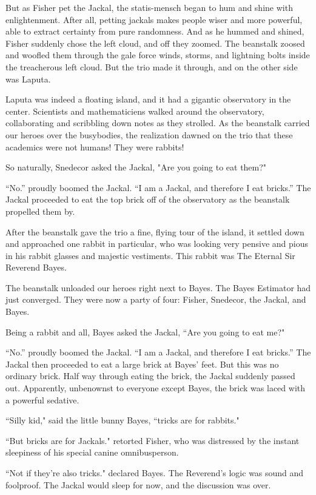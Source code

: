 \documentclass{article}
\begin{document}
But as Fisher pet the Jackal, the statis-mensch began to hum and shine with enlightenment. After all, petting jackals makes people wiser and more powerful, able to extract certainty from pure randomness. And as he hummed and shined, Fisher suddenly chose the left cloud, and off they zoomed. The beanstalk zoosed and woofled them through the gale force winds, storms, and lightning bolts inside the treacherous left cloud. But the trio made it through, and on the other side was Laputa. \newline

Laputa was indeed a floating island, and it had a gigantic observatory in the center. Scientists and mathematiciens walked around the observatory, collaborating and scribbling down notes as they strolled. As the beanstalk carried our heroes over the busybodies, the realization dawned on the trio that these academics were not humans! They were rabbits! \newline

So naturally, Snedecor asked the Jackal, "Are you going to eat them?" \newline

``No.'' proudly boomed the Jackal. ``I am a Jackal, and therefore I eat bricks.'' The Jackal proceeded to eat the top  brick off of the observatory as the beanstalk propelled them by. \newline

After the beanstalk gave the trio a fine, flying tour of the island, it settled down and approached one rabbit in particular, who was looking very pensive and pious in his rabbit glasses and majestic vestiments. This rabbit was The Eternal Sir Reverend Bayes. \newline

The beanstalk unloaded our heroes right next to Bayes. The Bayes Estimator had just converged. They were now a party of four: Fisher, Snedecor, the Jackal, and Bayes. \newline

Being a rabbit and all, Bayes asked the Jackal, ``Are you going to eat me?" \newline

``No.'' proudly boomed the Jackal. ``I am a Jackal, and therefore I eat bricks.'' The Jackal then proceeded to eat a large brick at Bayes' feet. But this was no ordinary brick. Half way through eating the brick, the Jackal suddenly passed out. Apparently, unbenownst to everyone except Bayes, the brick was laced with a powerful sedative. \newline

``Silly kid," said the little bunny Bayes, ``tricks are for rabbits." \newline

``But bricks are for Jackals." retorted Fisher, who was distressed by the instant sleepiness of his special canine omnibusperson. \newline

``Not if they're also tricks." declared Bayes. The Reverend's logic was sound and foolproof. The Jackal would sleep for now, and the discussion was over. \newline
\end{document}
